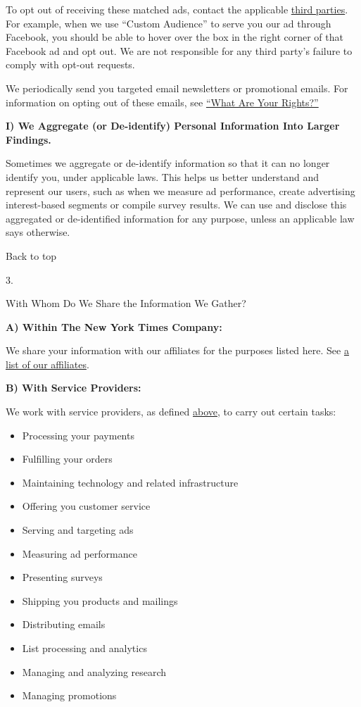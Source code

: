 To opt out of receiving these matched ads, contact the applicable
\href{/privacy/third-party}{third parties}. For example, when we use
``Custom Audience'' to serve you our ad through Facebook, you should be
able to hover over the box in the right corner of that Facebook ad and
opt out. We are not responsible for any third party's failure to comply
with opt-out requests.

We periodically send you targeted email newsletters or promotional
emails. For information on opting out of these emails, see
\protect\hyperlink{anchor-question4}{``What Are Your Rights?''}

\textbf{I) We Aggregate (or De-identify) Personal Information Into
Larger Findings.}

Sometimes we aggregate or de-identify information so that it can no
longer identify you, under applicable laws. This helps us better
understand and represent our users, such as when we measure ad
performance, create advertising interest-based segments or compile
survey results. We can use and disclose this aggregated or de-identified
information for any purpose, unless an applicable law says otherwise.

Back to top

3.

With Whom Do We Share the Information We Gather?

\textbf{A) Within The New York Times Company:}

We share your information with our affiliates for the purposes listed
here. See
\href{https://help.nytimes.com/hc/en-us/articles/360004990014}{a list of
our affiliates}.

\textbf{B) With Service Providers:}

We work with service providers, as defined
\protect\hyperlink{anchor-question2-sectionE}{above}, to carry out
certain tasks:

\begin{itemize}
\tightlist
\item
  Processing your payments
\item
  Fulfilling your orders
\item
  Maintaining technology and related infrastructure
\item
  Offering you customer service
\item
  Serving and targeting ads
\item
  Measuring ad performance
\item
  Presenting surveys
\item
  Shipping you products and mailings
\item
  Distributing emails
\item
  List processing and analytics
\item
  Managing and analyzing research
\item
  Managing promotions
\end{itemize}

